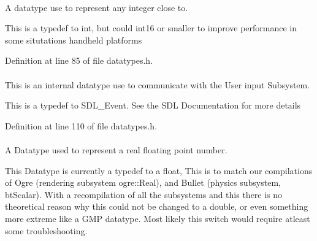 \hypertarget{namespacephys_a7f09bf5585b2bb97613cd9aad4273a81}{
\paragraph[{Integer}]{}\hfill}
\label{namespacephys_a7f09bf5585b2bb97613cd9aad4273a81}


A datatype use to represent any integer close to. 

This is a typedef to int, but could int16 or smaller to improve performance in some situtations handheld platforms 

Definition at line 85 of file datatypes.h.

\hypertarget{namespacephys_a8126d26e4507e66d09876988bb941fd4}{
\paragraph[{RawEvent}]{}\hfill}
\label{namespacephys_a8126d26e4507e66d09876988bb941fd4}


This is an internal datatype use to communicate with the User input Subsystem. 

This is a typedef to SDL\_\-Event. See the SDL Documentation for more details 

Definition at line 110 of file datatypes.h.

\hypertarget{namespacephys_af7eb897198d265b8e868f45240230d5f}{
\paragraph[{Real}]{}\hfill}
\label{namespacephys_af7eb897198d265b8e868f45240230d5f}


A Datatype used to represent a real floating point number. 

This Datatype is currently a typedef to a float, This is to match our compilations of Ogre (rendering subsystem ogre::Real), and Bullet (physics subsystem, btScalar). With a recompilation of all the subsystems and this there is no theoretical reason why this could not be changed to a double, or even something more extreme like a GMP datatype. Most likely this switch would require atleast some troubleshooting. 

